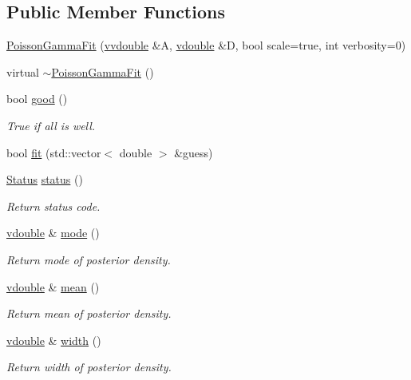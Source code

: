 \subsection*{Public Member Functions}
\begin{CompactItemize}
\item 
\hyperlink{classPoissonGammaFit_a0}{Poisson\-Gamma\-Fit} (\hyperlink{PoissonGammaFit_8hpp_a1}{vvdouble} \&A, \hyperlink{PoissonGammaFit_8hpp_a0}{vdouble} \&D, bool scale=true, int verbosity=0)
\item 
virtual \hyperlink{classPoissonGammaFit_a1}{$\sim$Poisson\-Gamma\-Fit} ()
\item 
bool \hyperlink{classPoissonGammaFit_a2}{good} ()
\begin{CompactList}\small\item\em True if all is well. \item\end{CompactList}\item 
bool \hyperlink{classPoissonGammaFit_a3}{fit} (std::vector$<$ double $>$ \&guess)
\item 
\hyperlink{classPoissonGammaFit_w7}{Status} \hyperlink{classPoissonGammaFit_a4}{status} ()
\begin{CompactList}\small\item\em Return status code. \item\end{CompactList}\item 
\hyperlink{PoissonGammaFit_8hpp_a0}{vdouble} \& \hyperlink{classPoissonGammaFit_a5}{mode} ()
\begin{CompactList}\small\item\em Return mode of posterior density. \item\end{CompactList}\item 
\hyperlink{PoissonGammaFit_8hpp_a0}{vdouble} \& \hyperlink{classPoissonGammaFit_a6}{mean} ()
\begin{CompactList}\small\item\em Return mean of posterior density. \item\end{CompactList}\item 
\hyperlink{PoissonGammaFit_8hpp_a0}{vdouble} \& \hyperlink{classPoissonGammaFit_a7}{width} ()
\begin{CompactList}\small\item\em Return width of posterior density. \item\end{CompactList}\item 

\end{CompactItemize}
